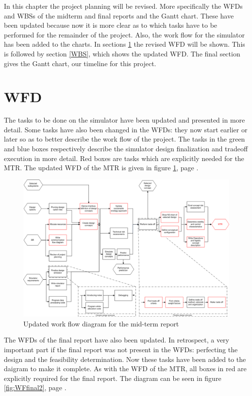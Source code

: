 In this chapter the project planning will be revised. More specifically the \acp{WFD} and \acp{WBS} of the midterm and final reports and the Gantt chart. These have been updated because now it is more clear as to which tasks have to be performed for the remainder of the project. Also, the work flow for the simulator has been added to the charts. In sections \ref{WFD} the revised \acl{WFD} will be shown. This is followed by section \ref{WBS}, which shows the updated \acl{WFD}. The final section gives the Gantt chart, our timeline for this project.

\section{\acl{WFD}}
\label{WFD}
The tasks to be done on the simulator have been updated and presented in more detail. Some tasks have also been 
changed in the \acp{WFD}: they now start earlier or later so as to better describe the work flow of the project. 
The tasks in the green and blue boxes respectively describe the simulator design finalization and tradeoff execution in more detail. Red boxes are tasks which are explicitly needed for the \ac{MTR}. The updated \ac{WFD} of the \ac{MTR} is given in figure \ref{fig:WFmidterm2}, page \pageref{fig:WFmidterm2}.

\begin{figure}
\centering
\includegraphics[width=\textheight, angle=90]{chapters/img/Workflow_diagram_MTR_v2.png}
\caption{Updated work flow diagram for the mid-term report}
\label{fig:WFmidterm2}
\end{figure}

The \acp{WFD} of the final report have also been updated. In retrospect, a very important part if the final report was not 
present in the \acp{WFD}: perfecting the design and the feasibility determination. Now these tasks have been added
to the daigram to make it complete. As with the \ac{WFD} of the \ac{MTR}, all boxes in red are explicitly required
for the final report. The diagram can be seen in figure \ref{fig:WFfinal2}, page \pageref{fig:WFfinal2}.

